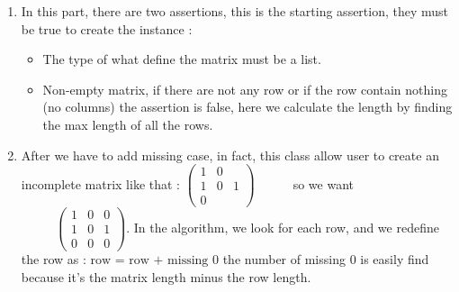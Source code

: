 \documentclass[10pt]{article}
\begin{document}
\begin{enumerate}%

\item{}
In this part, there are two assertions, this is the starting assertion, they must be true to create the instance :%

\begin{itemize}[noitemsep,topsep=\mdcompacttopsep]%

\item{}The type of what define the matrix must be a list.%

\item{}Non-empty matrix, if there are not any row or if the row contain nothing (no columns) the assertion is false,
here we calculate the length by finding the max length of all the rows.%
\end{itemize}%

\item{}
After we have to add missing case, in fact, this class allow user to create an incomplete matrix like that :\mdbr
{}$\begin{pmatrix} 1 & 0 &   \\1 & 0 & 1 \\0 &   & \end{pmatrix}\qquad\text{ }$ so we want $\text{ }\qquad\begin{pmatrix}1 & 0 & 0 \\1 & 0 & 1 \\0 & 0 & 0\end{pmatrix}$.\mdbr
{}In the algorithm, we look for each row, and  we redefine the row as : $\text{row = row + missing 0}$ the number of missing 0 is easily find because it's the matrix length minus the row length. %
\end{enumerate}%
\end{document}
